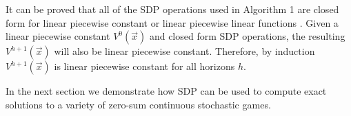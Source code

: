It can be proved that all of the SDP operations used in Algorithm 1 are
closed form for linear piecewise constant or linear piecewise linear
functions \cite{Sanner_UAI_2011,Zamani_AAAI_2012}. Given a linear 
piecewise constant $V^0(\vec{x})$ and closed form SDP operations, 
the resulting $V^{h+1}(\vec{x})$ will also be linear piecewise constant.
Therefore, by induction $V^{h+1}(\vec{x})$ is linear piecewise constant
for all horizons $h$.


In the next section we demonstrate how SDP can be used to compute
exact solutions to a variety of zero-sum continuous stochastic games.